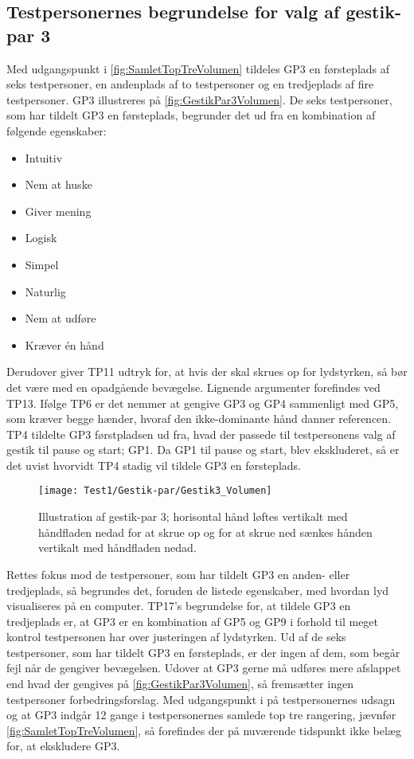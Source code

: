 \subsection{Testpersonernes begrundelse for valg af gestik-par 3}
\label{TestresultaterValgAfGestikkerBegrundelseGP3Volumen}
%
Med udgangspunkt i \autoref{fig:SamletTopTreVolumen} tildeles GP3 en førsteplads af seks testpersoner, en andenplads af to testpersoner og en tredjeplads af fire testpersoner. GP3 illustreres på \autoref{fig:GestikPar3Volumen}. De seks testpersoner, som har tildelt GP3 en førsteplads, begrunder det ud fra en kombination af følgende egenskaber: 
%
\begin{multicols}{3}
    \begin{itemize}
        \item Intuitiv
        \item Nem at huske
        \item Giver mening
        \item Logisk
        \item Simpel
        \item Naturlig
        \item Nem at udføre
        \item Kræver én hånd
\end{itemize}
\end{multicols}
\noindent
%
Derudover giver TP11 udtryk for, at hvis der skal skrues op for lydstyrken, så bør det være med en opadgående bevægelse. Lignende argumenter forefindes ved TP13. Ifølge TP6 er det nemmer at gengive GP3 og GP4 sammenligt med GP5, som kræver begge hænder, hvoraf den ikke-dominante hånd danner referencen. TP4 tildelte GP3 førstpladsen ud fra, hvad der passede til testpersonens valg af gestik til pause og start; GP1. Da GP1 til pause og start, blev ekskluderet, så er det uvist hvorvidt TP4 stadig vil tildele GP3 en førsteplads. 
%
\begin{figure}[H]
	\centering
	\texttt{[image: Test1/Gestik-par/Gestik3\_Volumen]}
	\caption{Illustration af gestik-par 3; horisontal hånd løftes vertikalt med håndfladen nedad for at skrue op og for at skrue ned sænkes hånden vertikalt med håndfladen nedad.}
	\label{fig:GestikPar3Volumen}
\end{figure}
\noindent
%
Rettes fokus mod de testpersoner, som har tildelt GP3 en anden- eller tredjeplads, så begrundes det, foruden de listede egenskaber, med hvordan lyd visualiseres på en computer. TP17's begrundelse for, at tildele GP3 en tredjeplads er, at GP3 er en kombination af GP5 og GP9 i forhold til meget kontrol testpersonen har over justeringen af lydstyrken. \blankline
%      
Ud af de seks testpersoner, som har tildelt GP3 en førsteplads, er der ingen af dem, som begår fejl når de gengiver bevægelsen. Udover at GP3 gerne må udføres mere afslappet end hvad der gengives på \autoref{fig:GestikPar3Volumen}, så fremsætter ingen testpersoner forbedringsforslag.\blankline
%
Med udgangspunkt i på testpersonernes udsagn og at GP3 indgår 12 gange i testpersonernes samlede top tre rangering, jævnfør \autoref{fig:SamletTopTreVolumen}, så forefindes der på nuværende tidspunkt ikke belæg for, at ekskludere GP3. 
%
